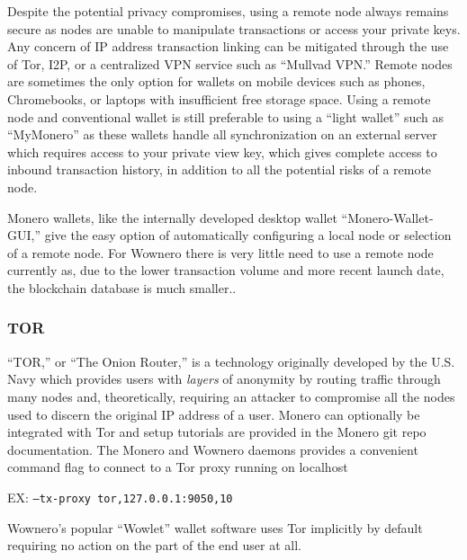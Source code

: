 Despite the potential privacy compromises, using a remote node always remains secure as nodes are unable to manipulate transactions or access your private keys\cite{localmonero-remotenode}. Any concern of IP address transaction linking can be mitigated through the use of Tor, I2P, or a centralized VPN service such as ``Mullvad VPN.'' Remote nodes are sometimes the only option for wallets on mobile devices such as phones, Chromebooks, or laptops with insufficient free storage space. Using a remote node and conventional wallet is still preferable to using a ``light wallet'' such as ``MyMonero'' as these wallets handle all synchronization on an external server which requires access to your private view key, which gives complete access to inbound transaction history, in addition to all the potential risks of a remote node\cite{localmonero-remotenode}.

Monero wallets, like the internally developed desktop wallet ``Monero-Wallet-GUI,'' give the easy option of automatically configuring a local node or selection of a remote node. For Wownero there is very little need to use a remote node currently as, due to the lower transaction volume and more recent launch date, the blockchain database is much smaller..


\subsubsection{TOR}
``TOR,'' or ``The Onion Router,'' is a technology originally developed by the U.S. Navy which provides users with \emph{layers} of anonymity by routing traffic through many nodes and, theoretically, requiring an attacker to compromise all the nodes used to discern the original IP address of a user.
Monero can optionally be integrated with Tor and setup tutorials are provided in the Monero git repo documentation\cite{monero_repo}. The Monero and Wownero daemons provides a convenient command flag to connect to a Tor proxy running on localhost
\\\centerline{EX: \texttt{--tx-proxy tor,127.0.0.1:9050,10}}

\smallskip
Wownero's popular ``Wowlet''\cite{wowlet} wallet software uses Tor implicitly by default requiring no action on the part of the end user at all. 



